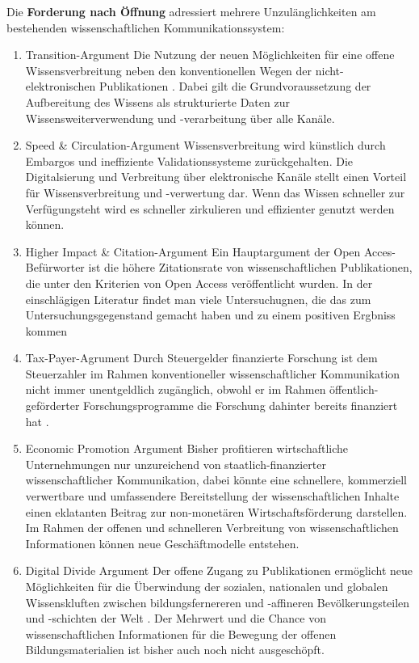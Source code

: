 Die \textbf{Forderung nach Öffnung} adressiert mehrere Unzulänglichkeiten am bestehenden wissenschaftlichen Kommunikationssystem:
\begin{enumerate}
\item Transition-Argument
Die Nutzung der neuen Möglichkeiten für eine offene Wissensverbreitung neben den konventionellen Wegen der nicht-elektronischen Publikationen . Dabei gilt die Grundvoraussetzung der Aufbereitung des Wissens als strukturierte Daten zur Wissensweiterverwendung und -verarbeitung über alle Kanäle.
\item Speed & Circulation-Argument
Wissensverbreitung wird künstlich durch Embargos und ineffiziente Validationssysteme zurückgehalten. Die Digitalsierung und Verbreitung über elektronische Kanäle stellt einen Vorteil für Wissensverbreitung und -verwertung dar. Wenn das Wissen schneller zur Verfügungsteht wird es schneller zirkulieren und effizienter genutzt werden können.  
\item Higher Impact & Citation-Argument
Ein Hauptargument der Open Acces-Befürworter ist die höhere Zitationsrate von wissenschaftlichen Publikationen, die unter den Kriterien von Open Access veröffentlicht wurden\cite{cite:21a}. In der einschlägigen Literatur findet man viele Untersuchugnen, die das zum Untersuchungsgegenstand gemacht haben und zu einem positiven Ergbniss kommen \cite{Lawrence_2001}\cite{Jeffrey_2008}\cite{Eysenbach_2006}\cite{Antelman_2004}
\item Tax-Payer-Agrument
Durch Steuergelder finanzierte Forschung ist dem Steuerzahler im Rahmen konventioneller wissenschaftlicher Kommunikation nicht immer unentgeldlich zugänglich, obwohl er im Rahmen öffentlich-geförderter Forschungsprogramme die Forschung dahinter bereits finanziert  hat .
\item Economic Promotion Argument
Bisher profitieren wirtschaftliche Unternehmungen nur unzureichend von staatlich-finanzierter wissenschaftlicher Kommunikation, dabei könnte eine schnellere, kommerziell verwertbare und umfassendere Bereitstellung der wissenschaftlichen Inhalte einen eklatanten Beitrag zur non-monetären Wirtschaftsförderung darstellen. Im Rahmen der offenen und schnelleren Verbreitung von wissenschaftlichen Informationen können neue Geschäftmodelle entstehen.
\item Digital Divide Argument
Der offene Zugang zu Publikationen ermöglicht neue Möglichkeiten für die Überwindung der sozialen, nationalen und globalen Wissenskluften  zwischen bildungsfernereren und -affineren Bevölkerungsteilen und -schichten der Welt . Der Mehrwert und die Chance von wissenschaftlichen Informationen für die Bewegung der offenen Bildungsmaterialien ist bisher auch noch nicht ausgeschöpft\cite{heise_lernen_2013}.

\end{enumerate}
